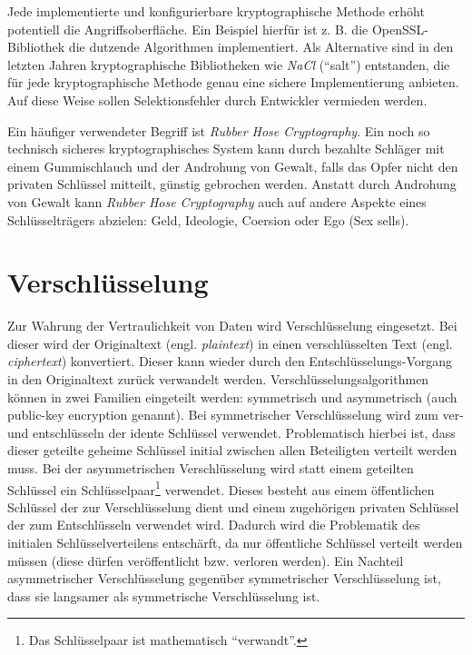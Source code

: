Jede implementierte und konfigurierbare kryptographische Methode erhöht potentiell die Angriffsoberfläche. Ein Beispiel hierfür ist z. B. die OpenSSL-Bibliothek die dutzende Algorithmen implementiert. Als Alternative sind in den letzten Jahren kryptographische Bibliotheken wie \textit{NaCl} (``salt'') entstanden, die für jede kryptographische Methode genau eine sichere Implementierung anbieten. Auf diese Weise sollen Selektionsfehler durch Entwickler vermieden werden.

Ein häufiger verwendeter Begriff ist \textit{Rubber Hose Cryptography}. Ein noch so technisch sicheres kryptographisches System kann durch bezahlte Schläger mit einem Gummischlauch und der Androhung von Gewalt, falls das Opfer nicht den privaten Schlüssel mitteilt, günstig gebrochen werden. Anstatt durch Androhung von Gewalt kann \textit{Rubber Hose Cryptography} auch auf andere Aspekte eines Schlüsselträgers abzielen: Geld, Ideologie, Coersion oder Ego (Sex sells).

\section{Verschlüsselung}

Zur Wahrung der Vertraulichkeit von Daten wird Verschlüsselung eingesetzt. Bei dieser wird der Originaltext (engl. \textit{plaintext}) in einen verschlüsselten Text (engl. \textit{ciphertext}) konvertiert. Dieser kann wieder durch den Entschlüsselungs-Vorgang in den Originaltext zurück verwandelt werden. Verschlüsselungsalgorithmen können in zwei Familien eingeteilt werden: symmetrisch und asymmetrisch (auch public-key encryption genannt). Bei symmetrischer Verschlüsselung wird zum ver- und entschlüsseln der idente Schlüssel verwendet. Problematisch hierbei ist, dass dieser geteilte geheime Schlüssel initial zwischen allen Beteiligten verteilt werden muss. Bei der asymmetrischen Verschlüsselung wird statt einem geteilten Schlüssel ein Schlüsselpaar\footnote{Das Schlüsselpaar ist mathematisch ``verwandt''.} verwendet. Dieses besteht aus einem öffentlichen Schlüssel der zur Verschlüsselung dient und einem zugehörigen privaten Schlüssel der zum Entschlüsseln verwendet wird. Dadurch wird die Problematik des initialen Schlüsselverteilens entschärft, da nur öffentliche Schlüssel verteilt werden müssen (diese dürfen veröffentlicht bzw. verloren werden). Ein Nachteil asymmetrischer Verschlüsselung gegenüber symmetrischer Verschlüsselung ist, dass sie langsamer als symmetrische Verschlüsselung ist.

